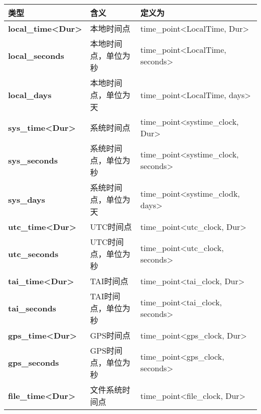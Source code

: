 \begin{longtable}[c]{|l|l|l|}
\hline
\textbf{类型}                                  & \textbf{含义}            & \textbf{定义为}                                         \\ \hline
\endfirsthead
%
\endhead
%
\textbf{local\_time\textless{}Dur\textgreater{}} & 本地时间点      & time\_point\textless{}LocalTime, Dur\textgreater{}      \\ \hline
\textbf{local\_seconds}                        & 本地时间点，单位为秒  & time\_point\textless{}LocalTime, seconds\textgreater{}      \\ \hline
\textbf{local\_days}                           & 本地时间点，单位为天     & time\_point\textless{}LocalTime, days\textgreater{}         \\ \hline
\textbf{sys\_time\textless{}Dur\textgreater{}}   & 系统时间点     & time\_point\textless{}systime\_clock, Dur\textgreater{} \\ \hline
\textbf{sys\_seconds}                          & 系统时间点，单位为秒 & time\_point\textless{}systime\_clock, seconds\textgreater{} \\ \hline
\textbf{sys\_days}                             & 系统时间点，单位为天    & time\_point\textless{}systime\_clodk, days\textgreater{}    \\ \hline
\textbf{utc\_time\textless{}Dur\textgreater{}} & UTC时间点               & time\_point\textless{}utc\_clock, Dur\textgreater{}         \\ \hline
\textbf{utc\_seconds}                          & UTC时间点，单位为秒    & time\_point\textless{}utc\_clock, seconds\textgreater{}     \\ \hline
\textbf{tai\_time\textless{}Dur\textgreater{}} & TAI时间点               & time\_point\textless{}tai\_clock, Dur\textgreater{}         \\ \hline
\textbf{tai\_seconds}                          & TAI时间点，单位为秒    & time\_point\textless{}tai\_clock, seconds\textgreater{}     \\ \hline
\textbf{gps\_time\textless{}Dur\textgreater{}} & GPS时间点               & time\_point\textless{}gps\_clock, Dur\textgreater{}         \\ \hline
\textbf{gps\_seconds}                          & GPS时间点，单位为秒    & time\_point\textless{}gps\_clock, seconds\textgreater{}     \\ \hline
\textbf{file\_time\textless{}Dur\textgreater{}}  & 文件系统时间点 & time\_point\textless{}file\_clock, Dur\textgreater{}    \\ \hline
\end{longtable}

